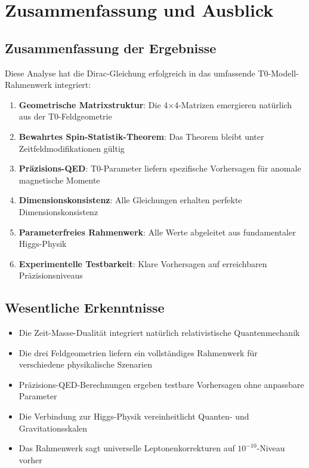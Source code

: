 \documentclass[12pt,a4paper]{article}
\begin{document}
\section{Zusammenfassung und Ausblick}
\label{sec:zusammenfassung}

\subsection{Zusammenfassung der Ergebnisse}
\label{subsec:zusammenfassung_ergebnisse}

Diese Analyse hat die Dirac-Gleichung erfolgreich in das umfassende T0-Modell-Rahmenwerk integriert:

\begin{enumerate}
	\item \textbf{Geometrische Matrixstruktur}: Die 4×4-Matrizen emergieren natürlich aus der T0-Feldgeometrie
	\item \textbf{Bewahrtes Spin-Statistik-Theorem}: Das Theorem bleibt unter Zeitfeldmodifikationen gültig
	\item \textbf{Präzisions-QED}: T0-Parameter liefern spezifische Vorhersagen für anomale magnetische Momente
	\item \textbf{Dimensionskonsistenz}: Alle Gleichungen erhalten perfekte Dimensionskonsistenz
	\item \textbf{Parameterfreies Rahmenwerk}: Alle Werte abgeleitet aus fundamentaler Higgs-Physik
	\item \textbf{Experimentelle Testbarkeit}: Klare Vorhersagen auf erreichbaren Präzisionsniveaus
\end{enumerate}

\subsection{Wesentliche Erkenntnisse}
\label{subsec:wesentliche_erkenntnisse}

\begin{tcolorbox}[colback=green!5!white,colframe=green!75!black,title=T0-Dirac-Integration: Hauptergebnisse]
	\begin{itemize}
		\item Die Zeit-Masse-Dualität integriert natürlich relativistische Quantenmechanik
		\item Die drei Feldgeometrien liefern ein vollständiges Rahmenwerk für verschiedene physikalische Szenarien
		\item Präzisions-QED-Berechnungen ergeben testbare Vorhersagen ohne anpassbare Parameter
		\item Die Verbindung zur Higgs-Physik vereinheitlicht Quanten- und Gravitationsskalen
		\item Das Rahmenwerk sagt universelle Leptonenkorrekturen auf $10^{-10}$-Niveau vorher
	\end{itemize}
\end{tcolorbox}
\end{document}
